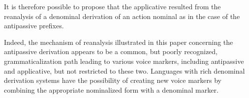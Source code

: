 \documentclass[oldfontcommands,oneside,a4paper,11pt]{article}
\newcommand{\ipa}[1]{{\phon \mbox{#1}}} %
\begin{document}
It is therefore possible to propose that the applicative resulted from the reanalysis of a denominal derivation of an action nominal as in the case of the antipassive prefixes.

 
 

Indeed, the mechanism of reanalysis illustrated in this paper concerning the antipassive derivation appears to be a common, but poorly recognized, grammaticalization path leading to various voice markers, including antipassive and applicative, but not restricted to these two. Languages with rich denominal derivation systems have the possibility of creating new voice markers by combining the appropriate nominalized form with a denominal marker. 


%
%
 
\end{document}
